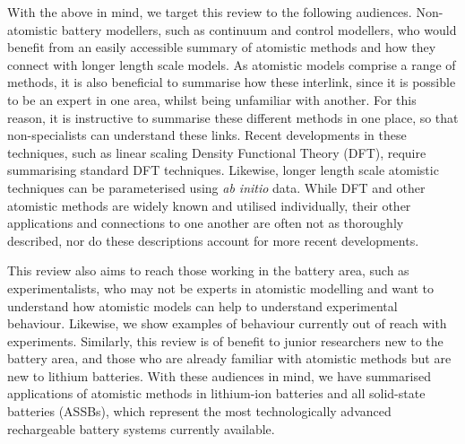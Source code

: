 \documentclass[../main.tex]{subfiles}
\begin{document}
With the above in mind, we target this review to the following audiences. Non-atomistic battery modellers, such as continuum and control modellers, who would benefit from an easily accessible summary of atomistic methods and how they connect with longer length scale models. As atomistic models comprise a range of methods, it is also beneficial to summarise how these interlink, since it is possible to be an expert in one area, whilst being unfamiliar with another. For this reason, it is instructive to summarise these different methods in one place, so that non-specialists can understand these links. Recent developments in these techniques, such as linear scaling Density Functional Theory (DFT), require summarising standard DFT techniques. Likewise, longer length scale atomistic techniques can be parameterised using \textit{ab initio} data. While DFT and other atomistic methods are widely known and utilised individually, their other applications and connections to one another are often not as thoroughly described, nor do these descriptions account for more recent developments.

This review also aims to reach those working in the battery area, such as experimentalists, who may not be experts in atomistic modelling and want to understand how atomistic models can help to understand experimental behaviour. Likewise, we show examples of behaviour currently out of reach with experiments. Similarly, this review is of benefit to junior researchers new to the battery area, and those who are already familiar with atomistic methods but are new to lithium batteries. With these audiences in mind, we have summarised applications of atomistic methods in lithium-ion batteries and all solid-state batteries (ASSBs), which represent the most technologically advanced rechargeable battery systems currently available.
\end{document}
